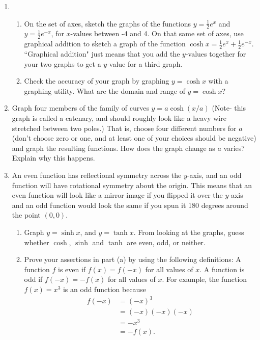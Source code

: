 \documentclass[12pt]{amsart}
\begin{document}
\bigskip

\bigskip

\begin{enumerate}

\item  ~
\begin{enumerate}
\item  On the set of axes, sketch the graphs of the functions $y = \frac{1}{2}e^x$ and $y = \frac{1}{2}e^{-x}$, for $x$-values between -4 and 4. On that same set of axes, use graphical addition to sketch a graph of the
function $\cosh x = \frac{1}{2}e^x + \frac{1}{2}e^{-x}$. ``Graphical addition" just means that you add the $y$-values together for your two graphs to get a $y$-value for a third graph.
\smallskip
\item  Check the accuracy of your graph by graphing $y = \cosh x$ with a graphing utility.  What are the domain and range of $y = \cosh x$?
\end{enumerate}
\bigskip
\item  Graph four members of the family of curves $y = a\cosh(x/a)$ (Note- this graph is called a
catenary, and should roughly look like a heavy wire stretched between two poles.) That
is, choose four different numbers for $a$ (don't choose zero or one, and at least one of your
choices should be negative) and graph the resulting functions. How does the graph change
as $a$ varies? Explain why this happens.
\bigskip
\item  An even function has reflectional symmetry across the $y$-axis, and an odd function will have
rotational symmetry about the origin. This means that an even function will look like a
mirror image if you flipped it over the $y$-axis and an odd function would look the same if
you spun it 180 degrees around the point $(0,0)$.
\begin{enumerate}
\item  Graph $y = \sinh x$, and $y = \tanh x$. From looking at the graphs, guess whether $\cosh$, $\sinh$ and $\tanh$ are even, odd, or neither.
\smallskip
\item  Prove your assertions in part (a) by using the following definitions: A function $f$ is even if $f(x) = f(-x)$ for all values of $x$.  A function is odd if $f(-x) = -f(x)$ for all values of $x$. For example, the function $f(x) = x^3$ is an odd function because
\begin{align*}
f(-x) & = (-x)^3\\ & = (-x)(-x)(-x) \\ & = -x^3 \\ & = -f(x).\end{align*}

\end{enumerate}
\end{enumerate}
\end{document}
